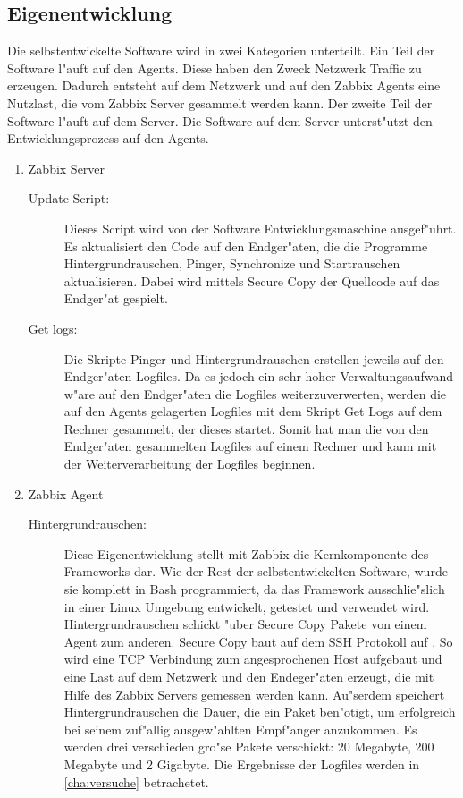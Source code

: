 \subsection{Eigenentwicklung}
\label{subsec:eigenentwicklung}
Die selbstentwickelte Software wird in zwei Kategorien unterteilt. Ein Teil der Software l"auft %
auf den Agents. Diese haben den Zweck Netzwerk Traffic zu erzeugen. Dadurch entsteht auf dem Netzwerk und %
auf den Zabbix Agents eine Nutzlast, die vom Zabbix Server gesammelt werden kann. Der zweite Teil der Software %
l"auft auf dem Server. Die Software auf dem Server unterst"utzt den Entwicklungsprozess auf den Agents. %
\begin{enumerate}
\item Zabbix Server 
\begin{description}
\item[Update Script:]Dieses Script wird von der Software Entwicklungsmaschine ausgef"uhrt. Es aktualisiert den Code auf den Endger"aten, %
die die Programme Hintergrundrauschen, Pinger, Synchronize und Startrauschen aktualisieren. Dabei wird mittels Secure Copy %
der Quellcode auf das Endger"at gespielt.

\item[Get logs:]Die Skripte Pinger und Hintergrundrauschen erstellen jeweils auf den Endger"aten Logfiles. %
Da es jedoch ein sehr hoher Verwaltungsaufwand w"are auf den Endger"aten die Logfiles weiterzuverwerten, %
werden die auf den Agents gelagerten Logfiles mit dem Skript Get Logs auf dem Rechner gesammelt, der dieses startet. %
Somit hat man die von den Endger"aten gesammelten Logfiles auf einem Rechner und kann %
mit der Weiterverarbeitung der Logfiles beginnen.      

\end{description}

\item Zabbix Agent

\begin{description}
\item[Hintergrundrauschen:]Diese Eigenentwicklung stellt mit Zabbix die Kernkomponente des Frameworks dar. Wie %
der Rest der selbstentwickelten Software, wurde sie komplett in Bash programmiert, da das Framework ausschlie"slich %
in einer Linux Umgebung entwickelt, getestet und verwendet wird. Hintergrundrauschen schickt "uber Secure Copy %
Pakete von einem Agent zum anderen. Secure Copy baut auf dem SSH Protokoll auf \autocite{artcl:thorbo}. %
So wird eine TCP Verbindung zum angesprochenen Host aufgebaut und %
eine Last auf dem Netzwerk und den Endeger"aten erzeugt, die mit Hilfe des Zabbix Servers  %
gemessen werden kann. Au"serdem speichert Hintergrundrauschen die Dauer, die ein Paket ben"otigt, um erfolgreich %
bei seinem zuf"allig ausgew"ahlten Empf"anger anzukommen. Es werden drei verschieden %
gro"se Pakete verschickt: 20 Megabyte, 200 Megabyte und 2 Gigabyte. Die Ergebnisse der Logfiles %
werden in \cref{cha:versuche} betrachetet.


\end{description}
\end{enumerate}
